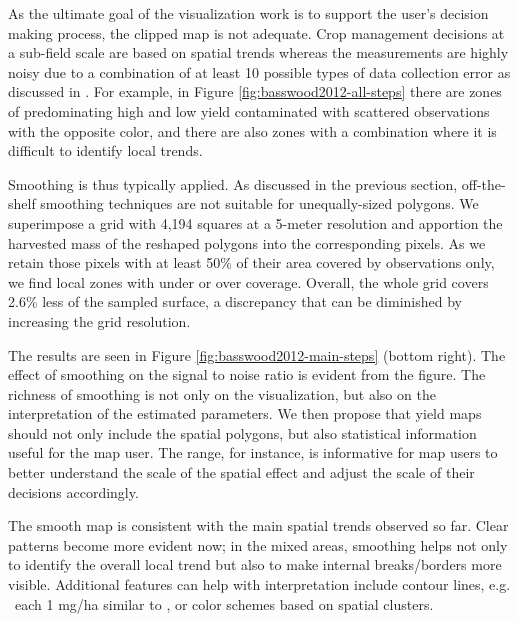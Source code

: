 As the ultimate goal of the visualization
work is to support the user's decision making process, the clipped
map is not adequate. Crop management decisions at a sub-field scale
are based on spatial trends whereas the measurements are highly noisy
due to a combination of at least 10 possible types of data collection
error as discussed in \cite{Lyle2013}. For example, in Figure
\ref{fig:basswood2012-all-steps} there are zones of predominating high
and low yield contaminated with scattered observations with the
opposite color, and there are also zones with a combination where it
is difficult to identify local trends.

 Smoothing is thus
typically applied. As discussed in the previous section,
off-the-shelf smoothing techniques are not suitable for
unequally-sized polygons. We superimpose a grid with 4,194 squares at
a 5-meter resolution and apportion the harvested mass of the reshaped
polygons into the corresponding pixels. As we retain those pixels with
at least 50\% of their area covered by observations only, we find
local zones with under or over coverage. Overall, the whole grid
covers 2.6\% less of the sampled surface, a discrepancy that can be
diminished by increasing the grid resolution.

 The results are seen in Figure
\ref{fig:basswood2012-main-steps} (bottom right). The effect of
smoothing on the signal to noise ratio is evident from the figure. The
richness of smoothing is not only on the visualization, but also on
the interpretation of the estimated parameters. We then propose that
yield maps should not only include the spatial polygons, but also
statistical information useful for the map user. The range, for
instance, is informative for map users to better understand the scale
of the spatial effect and adjust the scale of their decisions
accordingly. %

 The smooth map is consistent with
the main spatial trends observed so far. Clear patterns become more
evident now; in the mixed areas, smoothing helps not only to identify
the overall local trend but also to make internal breaks/borders more
visible. Additional features can help with interpretation include
contour lines, e.g. \ each 1 mg/ha similar to \cite{Blackmore1999}, or
color schemes based on spatial clusters.


